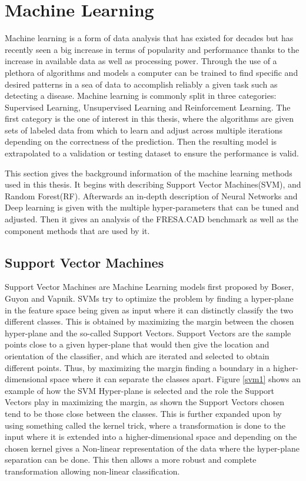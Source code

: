 \section{Machine Learning}

Machine learning is a form of data analysis that has existed for decades but has recently seen a big increase in terms of popularity and performance thanks to the increase in available data as well as processing power. Through the use of a plethora of algorithms and models a computer can be trained to find specific and desired patterns in a sea of data to accomplish reliably a given task such as detecting a disease. Machine learning is commonly split in three categories: Supervised Learning, Unsupervised Learning and Reinforcement Learning. The first category is the one of interest in this thesis, where the algorithms are given sets of labeled data from which to learn and adjust across multiple iterations depending on the correctness of the prediction. Then the resulting model is extrapolated to a validation or testing dataset to ensure the performance is valid.

This section gives the background information of the machine learning methods used in this thesis. It begins with describing Support Vector Machines(SVM), and Random Forest(RF). Afterwards an in-depth description of Neural Networks and Deep learning is given with the multiple hyper-parameters that can be tuned and adjusted. Then it gives an analysis of the FRESA.CAD benchmark as well as the component methods that are used by it.

\subsection{Support Vector Machines}
\label{RF}
Support Vector Machines are Machine Learning models first proposed by Boser, Guyon and Vapnik\cite{Boser:1992:TAO:130385.130401}. SVMs try to optimize the problem by finding a hyper-plane in the feature space being given as input where it can distinctly classify the two different classes. This is obtained by maximizing the margin between the chosen hyper-plane and the so-called Support Vectors. Support Vectors are the sample points close to a given hyper-plane that would then give the location and orientation of the classifier, and which are iterated and selected to obtain different points. Thus, by maximizing the margin finding a boundary in a higher-dimensional space where it can separate the classes apart. Figure \ref{svm1} shows an example of how the SVM Hyper-plane is selected and the role the Support Vectors play in maximizing the margin, as shown the Support Vectors chosen tend to be those close between the classes. This is further expanded upon by using something called the kernel trick, where a transformation is done to the input where it is extended into a higher-dimensional space and depending on the chosen kernel gives a Non-linear representation of the data where the hyper-plane separation can be done. This then allows a more robust and complete transformation allowing non-linear classification. 

